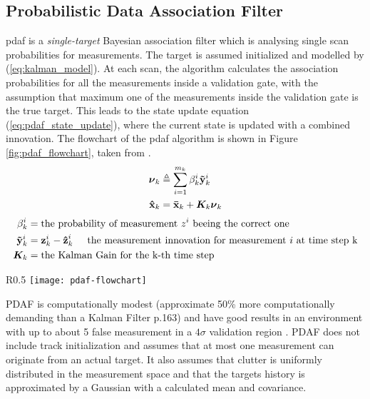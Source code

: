 \subsection{Probabilistic Data Association Filter}
\label{pdaf}
\gls{pdaf} is a \emph{single-target} Bayesian association filter which is analysing single scan probabilities for \glspl{measurement}. The \gls{target} is assumed initialized and modelled by (\ref{eq:kalman_model}). At each scan, the algorithm calculates the association probabilities for all the \glspl{measurement} inside a validation gate, with the assumption that maximum one of the \glspl{measurement} inside the validation gate is the true \gls{target}. This leads to the state update equation (\ref{eq:pdaf_state_update}), where the current state is updated with a combined innovation. The flowchart of the \gls{pdaf} algorithm is shown in Figure \ref{fig:pdaf_flowchart}, taken from \cite{Bar-Shalom1998}.
\begin{equation}
\begin{split}
\boldsymbol{\mathbf{\nu}}_k &\triangleq \sum\limits_{i=1}^{m_k} \beta_k^i \boldsymbol{\mathbf{\tilde{y}}}_k^i \\
\boldsymbol{\mathbf{\hat{x}}}_{k} &= \boldsymbol{\mathbf{\bar{x}}}_{k} + \bm{K}_k \boldsymbol{\mathbf{\nu}}_k
\end{split}
\label{eq:pdaf_state_update}
\end{equation} 
\begin{equation*}
\begin{split}
	\beta_k^i	&= \text{the probability of measurement $z^i$ beeing the correct one} \\
	\boldsymbol{\mathbf{\tilde{y}}}_k^i &= \boldsymbol{\mathbf{z}}_k^i - \boldsymbol{\mathbf{\hat{z}}}_k^i \hspace{5mm}	\text{the measurement innovation for measurement $i$ at time step k} \\
	\bm{K}_k 	&= \text{the Kalman Gain for the k-th time step} \\
\end{split}
\end{equation*}
\begin{wrapfigure}[23]{R}{0.5\textwidth}
\centering
\texttt{[image: pdaf-flowchart]}
\caption{\gls{pdaf} flowchart}
\label{fig:pdaf_flowchart}
\end{wrapfigure}

PDAF is computationally modest (approximate 50\% more computationally demanding than a Kalman Filter \cite{Bar-Shalom1998} p.163) and have good results in an environment with up to about 5 false \gls{measurement} in a $4\sigma$ validation region \cite{Bar-Shalom1998}. PDAF does not include track initialization and assumes that at most one \gls{measurement} can originate from an actual \gls{target}. It also assumes that clutter is uniformly distributed in the \gls{measurement} space and that the \glspl{target} history is approximated by a Gaussian with a calculated mean and covariance.

